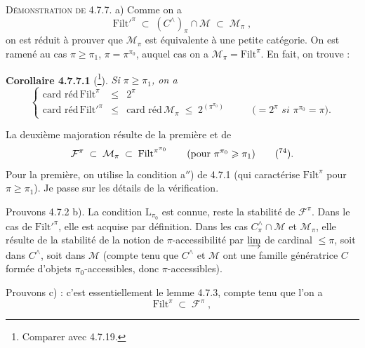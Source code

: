 \documentclass[11pt]{article}
\newcommand{\msp}[1]{\marginpar{\footnotesize [#1]}}
\newcommand{\Filt}{\mathrm{Filt}}
\newcommand{\cardred}{\text{card réd}\,}
\begin{document}
\textsc{Démonstration de} 4.7.7. a) Comme on a
\[
\Filt'^{\pi} \;\subset\; (C^{\wedge})_{\pi} \cap \mathcal{M} \;\subset\; \mathcal{M}_{\pi} \;,
\]
on est réduit à prouver que $\mathcal{M}_{\pi}$ est équivalente à une petite catégorie. On est ramené au cas $\pi \geqslant \pi_1$, $\pi = \pi^{\pi_0}$, auquel cas on a $\mathcal{M}_{\pi} = \Filt^{\pi}$. En fait, on trouve :

\textbf{Corollaire 4.7.7.1} (\footnote[73]{Comparer avec 4.7.19.}). \textit{Si $\pi \geqslant \pi_1$, on a}
\[
\left\{
\begin{array}{rcll}
\cardred \Filt^{\pi} & \leqslant & 2^{\pi} & \\[4pt]
\cardred \Filt'^{\pi} & \leqslant & \cardred \mathcal{M}_{\pi} \;\leqslant\; 2^{(\pi^{\pi_0})} & \qquad \textit{($= 2^{\pi}$ si $\pi^{\pi_0} = \pi$).}
\end{array}
\right.
\]

La deuxième majoration résulte de la première et de
\[
\mathcal{F}^{\pi} \;\subset\; \mathcal{M}_{\pi} \;\subset\; \Filt^{\pi^{\pi_0}} \qquad (\text{pour } \pi^{\pi_0} \geqslant \pi_1) \qquad \text{(\footnotemark[74]).}
\]
Pour la première, on utilise la condition a$''$) de 4.7.1 (qui caractérise $\Filt^{\pi}$ pour $\pi \geqslant \pi_1$). Je passe sur les détails de la vérification.

\msp{page 174}
Prouvons 4.7.2 b). La condition $\mathrm{L}_{\pi_0}$ est connue, reste la stabilité de $\mathcal{F}^{\pi}$. Dans le cas de $\Filt'^{\pi}$, elle est acquise par définition. Dans les cas $C^{\wedge}_{\pi} \cap \mathcal{M}$ et $\mathcal{M}_{\pi}$, elle résulte de la stabilité de la notion de $\pi$-accessibilité par $\varinjlim$ de cardinal $\leqslant \pi$, soit dans $C^{\wedge}$, soit dans $\mathcal{M}$ (compte tenu que $C^{\wedge}$ et $\mathcal{M}$ ont une famille génératrice $C$ formée d’objets $\pi_0$-accessibles, donc $\pi$-accessibles).

Prouvons c) : c’est essentiellement le lemme 4.7.3, compte tenu que l’on a
\[
\Filt^{\pi} \;\subset\; \mathcal{F}^{\pi} \;,
\]
\end{document}

